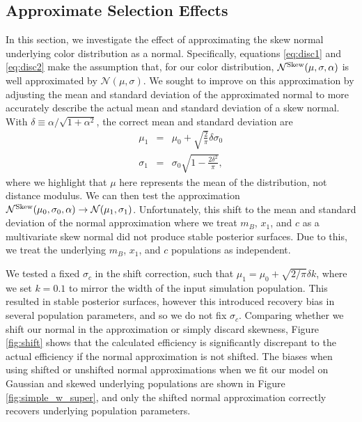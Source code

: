 \documentclass[a4paper,fleqn,usenatbib,manuscript]{emulateapj}
\begin{document}
\subsection{Approximate Selection Effects}
\label{app:approx}

In this section, we investigate the effect of approximating the skew normal underlying color distribution as a normal. Specifically, equations \eqref{eq:disc1} and \eqref{eq:disc2} make the assumption that, for our color distribution, $\mathcal{N}^{\rm Skew}(\mu, \sigma, \alpha)$ is well approximated by $\mathcal{N}(\mu, \sigma)$. We sought to improve on this approximation by adjusting the mean and standard deviation of the approximated normal to more accurately describe the actual mean and standard deviation of a skew normal. With $\delta \equiv \alpha/\sqrt{1+\alpha^2}$, the correct mean and standard deviation are
\begin{eqnarray}
\mu_1 &=& \mu_0 + \sqrt{\frac{2}{\pi}} \delta \sigma_0 \\
\sigma_1 &=& \sigma_0 \sqrt{1 - \frac{2 \delta^2}{\pi}},
\end{eqnarray}
where we highlight that $\mu$ here represents the mean of the distribution, not distance modulus. We can then test the approximation $\mathcal{N}^{\rm Skew}(\mu_0, \sigma_0, \alpha) \rightarrow \mathcal{N}(\mu_1, \sigma_1)$. Unfortunately, this shift to the mean and standard deviation of the normal approximation where we treat $m_B$, $x_1$, and $c$ as a multivariate skew normal did not produce stable posterior surfaces. Due to this, we treat the underlying $m_B$, $x_1$, and $c$ populations as independent. 

We tested a fixed $\sigma_c$ in the shift correction, such that $\mu_1 = \mu_0 + \sqrt{2/\pi}\delta k$, where we set $k=0.1$ to mirror the width of the input simulation population. This resulted in stable posterior surfaces, however this introduced recovery bias in several population parameters, and so we do not fix $\sigma_c$. Comparing whether we shift our normal in the approximation or simply discard skewness, Figure \ref{fig:shift} shows that the calculated efficiency is significantly discrepant to the actual efficiency if the normal approximation is not shifted. The biases when using shifted or unshifted normal approximations when we fit our model on Gaussian and skewed underlying populations are shown in Figure \ref{fig:simple_w_super}, and only the shifted normal approximation correctly recovers underlying population parameters.
\end{document}
